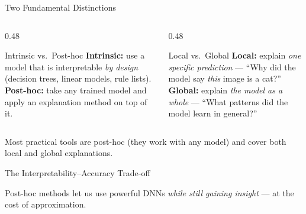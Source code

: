 \documentclass[aspectratio=169]{beamer}
\begin{document}
\begin{frame}{Two Fundamental Distinctions}
  \begin{columns}[T]
    \begin{column}{0.48\textwidth}
      \begin{block}{Intrinsic vs.\ Post-hoc}
        \textbf{Intrinsic:} use a model that is interpretable \emph{by design}
        (decision trees, linear models, rule lists).\\[4pt]
        \textbf{Post-hoc:} take any trained model and apply an explanation method
        on top of it.
      \end{block}
    \end{column}
    \begin{column}{0.48\textwidth}
      \begin{block}{Local vs.\ Global}
        \textbf{Local:} explain \emph{one specific prediction}
        — ``Why did the model say \emph{this} image is a cat?''\\[4pt]
        \textbf{Global:} explain \emph{the model as a whole}
        — ``What patterns did the model learn in general?''
      \end{block}
    \end{column}
  \end{columns}

  \vspace{0.8em}
  Most practical tools are \alert{post-hoc} (they work with any model) and
  cover \alert{both} local and global explanations.
\end{frame}

\begin{frame}{The Interpretability–Accuracy Trade-off}
  \begin{center}
  \end{center}
  \small Post-hoc methods let us use powerful DNNs \emph{while still gaining insight}
  — at the cost of approximation.
\end{frame}
\end{document}
